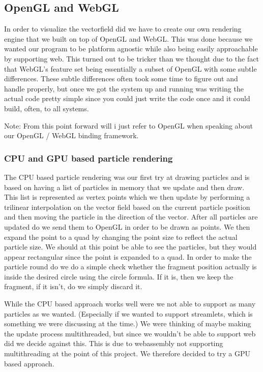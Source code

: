 \documentclass{article}
\begin{document}
\subsection*{OpenGL and WebGL}

In order to visualize the vectorfield did we have to create our own rendering engine that we built on top of OpenGL and WebGL. This was done because we wanted our program to be platform agnostic while also being easily approachable by supporting web. This turned out to be tricker than we thought due to the fact that WebGL's feature set being essentially a subset of OpenGL with some subtle differences. These subtle differences often took some time to figure out and handle properly, but once we got the system up and running was writing the actual code pretty simple since you could just write the code once and it could build, often, to all systems. 

Note: From this point forward will i just refer to OpenGL when speaking about our OpenGL / WebGL binding framework.

\subsubsection{CPU and GPU based particle rendering}

The CPU based particle rendering was our first try at drawing particles and is based on having a list of particles in memory that we update and then draw. This list is represented as vertex points which we then update by performing a trilinear interpolation on the vector field based on the current particle position and then moving the particle in the direction of the vector. After all particles are updated do we send them to OpenGL in order to be drawn as points. We then expand the point to a quad by changing the point size to reflect the actual particle size. We should at this point be able to see the particles, but they would appear rectangular since the point is expanded to a quad. In order to make the particle round do we do a simple check whether the fragment position actually is inside the desired circle using the circle formula. If it is, then we keep the fragment, if it isn't, do we simply discard it.

While the CPU based approach works well were we not able to support as many particles as we wanted. (Especially if we wanted to support streamlets, which is something we were discussing at the time.) We were thinking of maybe making the update process multithreaded, but since we wouldn't be able to support web did we decide against this. This is due to webassembly not supporting multithreading at the point of this project. We therefore decided to try a GPU based approach.
\end{document}
